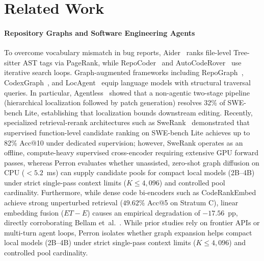 \documentclass[10pt]{article}
\begin{document}
\section{Related Work}
\label{sec:related}
\paragraph{Repository Graphs and Software Engineering Agents}
To overcome vocabulary mismatch in bug reports, Aider~\cite{gauthier2023aider} ranks file-level Tree-sitter AST tags via PageRank, while RepoCoder~\cite{zhang2023repocoder} and AutoCodeRover~\cite{zhang2024autocoderover} use iterative search loops. Graph-augmented frameworks including RepoGraph~\cite{ouyang2025repograph}, CodexGraph~\cite{liu2025codexgraph}, and LocAgent~\cite{chen2025locagent} equip language models with structural traversal queries. In particular, Agentless~\cite{xia2025agentless} showed that a non-agentic two-stage pipeline (hierarchical localization followed by patch generation) resolves 32\% of SWE-bench Lite, establishing that localization bounds downstream editing. Recently, specialized retrieval-rerank architectures such as SweRank~\cite{reddy2026swerank} demonstrated that supervised function-level candidate ranking on SWE-bench Lite achieves up to 82\% Acc@10 under dedicated supervision; however, SweRank operates as an offline, compute-heavy supervised cross-encoder requiring extensive GPU forward passes, whereas Perron evaluates whether unassisted, zero-shot graph diffusion on CPU ($<5.2$~ms) can supply candidate pools for compact local models (2B--4B) under strict single-pass context limits ($K \le 4,096$) and controlled pool cardinality. Furthermore, while dense code bi-encoders such as CodeRankEmbed~\cite{suresh2024coderankembed} achieve strong unperturbed retrieval ($49.62\%$ Acc@5 on Stratum C), linear embedding fusion ($ET-E$) causes an empirical degradation of $-17.56$~pp, directly corroborating Bellam et~al.~\cite{bellam2025limits}. While prior studies rely on frontier APIs or multi-turn agent loops, Perron isolates whether graph expansion helps compact local models (2B--4B) under strict single-pass context limits ($K \le 4,096$) and controlled pool cardinality.
\end{document}
